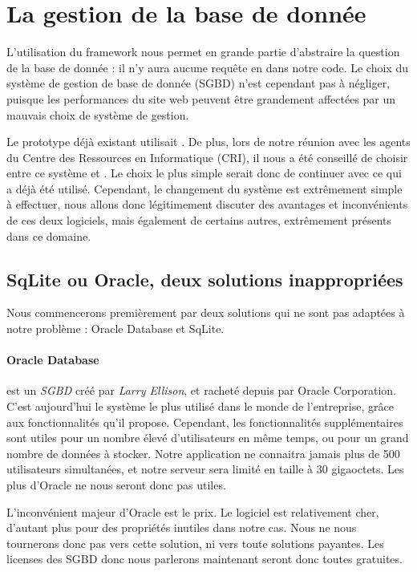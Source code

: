 \section{La gestion de la base de donnée}

L'utilisation du framework \symfony nous permet en grande partie d'abstraire la question de la base de donnée : il n'y aura aucune requête en \sql dans notre code. 
Le choix du système de gestion de base de donnée (SGBD) n'est cependant pas  à négliger, puisque les performances du site web peuvent être grandement affectées par un mauvais choix de système de gestion. 

Le prototype déjà existant utilisait \mysql. 
De plus, lors de notre réunion avec les agents du Centre des Ressources en Informatique (CRI), il nous a été conseillé de choisir entre ce système et \psql. 
Le choix le plus simple serait donc de continuer avec ce qui a déjà été utilisé. 
Cependant, le changement du système est extrêmement simple à effectuer, nous allons donc légitimement  discuter des avantages et inconvénients de ces deux logiciels, mais également de certains autres, extrêmement présents dans ce domaine. 

\subsection{SqLite ou Oracle, deux solutions inappropriées}

Nous commencerons premièrement par deux solutions qui ne sont pas adaptées à notre problème : Oracle Database et SqLite. 

\paragraph*{Oracle Database } est un \textit{SGBD} créé par \textit{Larry Ellison}, et racheté depuis par Oracle Corporation. C'est aujourd'hui le système le plus utilisé dans le monde de l'entreprise, grâce aux fonctionnalités qu'il propose. 
Cependant, les fonctionnalités supplémentaires sont utiles pour un nombre élevé d'utilisateurs en même temps, ou pour un grand nombre de données à stocker. Notre application ne connaitra jamais plus de 500 utilisateurs simultanées, et notre serveur sera limité en taille à 30 gigaoctets. Les plus d'Oracle ne nous seront donc pas utiles. 

L'inconvénient majeur d'Oracle est le prix. Le logiciel est relativement cher, d'autant plus pour des propriétés inutiles dans notre cas.
Nous ne nous tournerons donc pas vers cette solution, ni vers toute solutions payantes. Les licenses des SGBD donc nous parlerons maintenant seront donc toutes gratuites.  


